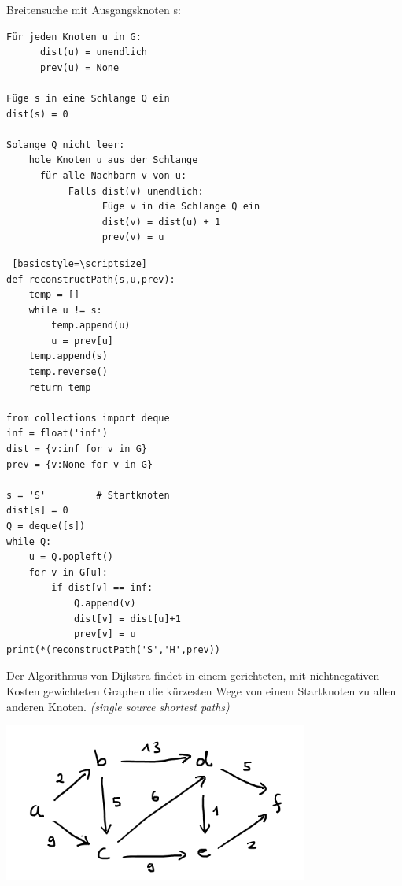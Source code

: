 \begin{frame}[fragile]
Breitensuche mit Ausgangsknoten s:
\begin{lstlisting} 
Für jeden Knoten u in G: 
      dist(u) = unendlich 
      prev(u) = None

Füge s in eine Schlange Q ein 
dist(s) = 0

Solange Q nicht leer:
	hole Knoten u aus der Schlange
      für alle Nachbarn v von u:
           Falls dist(v) unendlich:
                 Füge v in die Schlange Q ein
                 dist(v) = dist(u) + 1
                 prev(v) = u
\end{lstlisting}
\end{frame}

\begin{frame}[fragile]
\begin{lstlisting} [basicstyle=\scriptsize]
def reconstructPath(s,u,prev):
    temp = []
    while u != s:
        temp.append(u)
        u = prev[u]
    temp.append(s)
    temp.reverse()
    return temp

from collections import deque       
inf = float('inf')
dist = {v:inf for v in G}
prev = {v:None for v in G}

s = 'S'         # Startknoten
dist[s] = 0     
Q = deque([s])       
while Q:
    u = Q.popleft()
    for v in G[u]:
        if dist[v] == inf:
            Q.append(v)
            dist[v] = dist[u]+1
            prev[v] = u
print(*(reconstructPath('S','H',prev))

\end{lstlisting}
\end{frame}

\begin{frame}[fragile]
Der Algorithmus von Dijkstra findet  in einem gerichteten, mit nichtnegativen Kosten gewichteten
Graphen die kürzesten Wege von einem Startknoten zu allen anderen Knoten.
\textit{(single source shortest paths)} \pause

\includegraphics[width=10cm]{bild43.png}
\end{frame}

